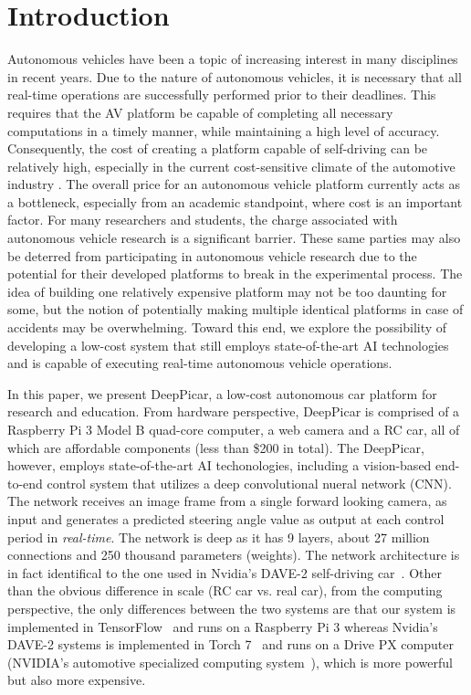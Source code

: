 \section{Introduction} \label{sec:intro}

Autonomous vehicles have been a topic of increasing interest in many
disciplines in recent years. Due to the nature of autonomous vehicles,
it is necessary that all real-time operations are successfully
performed prior to their deadlines. This requires that the AV platform
be capable of completing all necessary computations in a timely
manner, while maintaining a high level of accuracy. Consequently, the
cost of creating a platform capable of self-driving can be relatively
high, especially in the current cost-sensitive climate of the
automotive industry \cite{}. The overall price for an autonomous
vehicle platform currently acts as a bottleneck, especially from an
academic standpoint, where cost is an important factor. For many
researchers and students, the charge associated with autonomous
vehicle research is a significant barrier. These same parties may also
be deterred from participating in autonomous vehicle research due to
the potential for their developed platforms to break in the
experimental process. The idea of building one relatively expensive
platform may not be too daunting for some, but the notion of
potentially making multiple identical platforms in case of accidents
may be overwhelming. Toward this end, we explore the possibility of
developing a low-cost system that still employs state-of-the-art AI
technologies and is capable of executing real-time autonomous vehicle
operations. 
	
In this paper, we present DeepPicar, a low-cost autonomous car
platform for research and education. From hardware perspective, 
DeepPicar is comprised of a Raspberry Pi 3 Model B quad-core
computer, a web camera and a RC car, all of which are affordable
components (less than \$200 in total).
The DeepPicar, however, employs state-of-the-art AI
techonologies, including a vision-based end-to-end control system that
utilizes a deep convolutional nueral network (CNN).
The network receives an image frame from a single forward
looking camera, as input and generates a predicted steering angle
value as output at each control period in \emph{real-time}. 
The network is deep as it has 9 layers, about 27 million connections
and 250 thousand parameters (weights).
The network architecture is in fact identifical to the one
used in Nvidia's DAVE-2 self-driving car~\cite{Bojarski2016}. Other
than the obvious difference in scale (RC car vs. real car), from the
computing perspective, the only differences between
the two systems are that our system is implemented in
TensorFlow~\cite{abadi2016tensorflow} and runs on a 
Raspberry Pi 3 whereas Nvidia's DAVE-2 systems is implemented in Torch
7~\cite{collobert2011torch7} and runs on a Drive PX computer (NVIDIA's
automotive specialized computing system~\cite{drivepx}), which is more
powerful but also more expensive.

